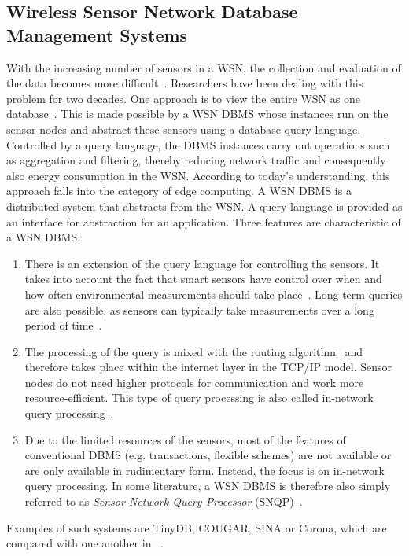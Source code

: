 \documentclass[english,version-2019-11]{uzl-thesis}
\begin{document}
\subsection{Wireless Sensor Network Database Management Systems}
With the increasing number of sensors in a WSN, the collection and evaluation of the data becomes more difficult~\cite{WSNDatabases}. Researchers have been dealing with this problem for two decades. One approach is to view the entire WSN as one database~\cite{SNasDB}. This is made possible by a WSN DBMS whose instances run on the sensor nodes and abstract these sensors using a database query language. Controlled by a query language, the DBMS instances carry out operations such as aggregation and filtering, thereby reducing network traffic and consequently also energy consumption in the WSN. According to today's understanding, this approach falls into the category of edge computing.
A WSN DBMS is a distributed system that abstracts from the WSN. A query language is provided as an interface for abstraction for an application. Three features are characteristic of a WSN DBMS:
\begin{enumerate}
 \item There is an extension of the query language for controlling the sensors. It takes into account the fact that smart sensors have control over when and how often environmental measurements should take place~\cite{TinyDB}. Long-term queries are also possible, as sensors can typically take measurements over a long period of time~\cite{Cougar}.
 \item The processing of the query is mixed with the routing algorithm~\cite{SNasDB} and therefore takes place within the internet layer in the TCP/IP model. Sensor nodes do not need higher protocols for communication and work more resource-efficient. This type of query processing is also called in-network query processing~\cite{SNQP}.
 \item Due to the limited resources of the sensors, most of the features of conventional DBMS (e.g. transactions, flexible schemes) are not available or are only available in rudimentary form. Instead, the focus is on in-network query processing. In some literature, a WSN DBMS is therefore also simply referred to as \emph{Sensor Network Query Processor} (SNQP)~\cite{SNQP}.
\end{enumerate}

Examples of such systems are TinyDB, COUGAR, SINA or Corona, which are compared with one another in ~\cite{WSNDatabases}.
\end{document}
